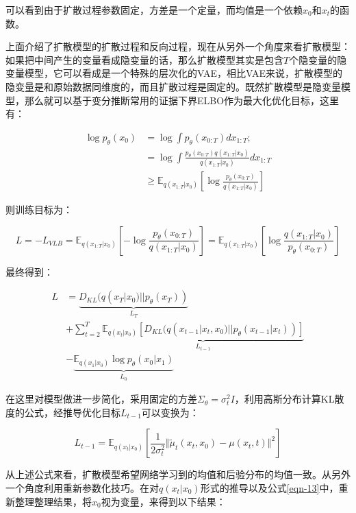 可以看到由于扩散过程参数固定，方差是一个定量，而均值是一个依赖$x_0$和$x_t$的函数。

上面介绍了扩散模型的扩散过程和反向过程，现在从另外一个角度来看扩散模型：如果把中间产生的变量看成隐变量的话，那么扩散模型其实是包含$T$个隐变量的隐变量模型，它可以看成是一个特殊的层次化的VAE，相比VAE来说，扩散模型的隐变量是和原始数据同维度的，而且扩散过程是固定的。既然扩散模型是隐变量模型，那么就可以基于变分推断常用的证据下界ELBO作为最大化优化目标，这里有：

\begin{align}
      \log{p_{\theta}(x_0)} &= \log{\int{p_{\theta}(x_{0:T})dx_{1:T}}};\nonumber\\
      &=\log{\int{\frac{p_{\theta}(x_{0:T})q(x_{1:T}|x_0)}{q(x_{1:T}|x_0)}dx_{1:T}}} \nonumber\\
      &\ge \mathbb{E}_{q(x_{1:T}|x_0)}[\log{\frac{p_{\theta}(x_{0:T})}{q(x_{1:T}|x_0)}}]\nonumber
\end{align}

则训练目标为：

\begin{equation}\label{eqn-22}
L = - L_{VLB} = \mathbb{E}_{q(x_{1:T}|x_0)}[-\log{\frac{p_{\theta}(x_{0:T})}{q(x_{1:T}|x_0)}}] = \mathbb{E}_{q(x_{1:T}|x_0)}[\log{\frac{q(x_{1:T}|x_0)}{p_{\theta}(x_{0:T})}}]
\end{equation}

最终得到：

\begin{align}
      L &= \underbrace{D_{KL}(q(x_T|x_0) || p_\theta(x_T))}_{L_T} \nonumber\\
      &+ \sum^T_{t=2}{\underbrace{\mathbb{E}_{q(x_t|x_0)}[D_{KL}(q(x_{t-1}|x_t,x_0) || p_\theta(x_{t-1}|x_t))]}_{L_{t-1}}} \nonumber\\
      &- \underbrace{\mathbb{E}_{q(x_1|x_0)}\log{p_\theta(x_0|x_1)}}_{L_0} \label{eqn-23}
\end{align}

在这里对模型做进一步简化，采用固定的方差$\Sigma_\theta=\sigma^2_tI$，利用高斯分布计算KL散度的公式，经推导优化目标$L_{t-1}$可以变换为：

\begin{equation}\label{eqn-24}
L_{t-1}=\mathbb{E}_{q(x_t|x_0)}[\frac{1}{2\sigma^2_t}\Vert \widetilde{\mu}_t(x_t,x_0)-\mu(x_t,t) \Vert^2]
\end{equation}

从上述公式来看，扩散模型希望网络学习到的均值和后验分布的均值一致。从另外一个角度利用重新参数化技巧。在对$q ( x_t | x_0 )$形式的推导以及公式\eqref{eqn-13}中，重新整理整理结果，将$x_0$视为变量，来得到以下结果：


